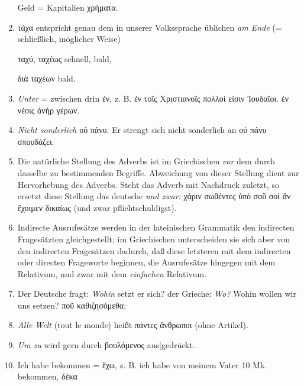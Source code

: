 \begin{enumerate}[leftmargin=0pt,rightmargin=0pt,listparindent =1cm,labelindent=1cm,labelsep=1ex,labelwidth={*},itemindent={*},align=left]
\begin{continuousitemline}Geld = Kapitalien \textgreek[variant=ancient]{χρήματα.
}\par\end{continuousitemline}

\item \textgreek[variant=ancient]{τάχα} ent\textcompwordmark{}spricht
genau dem in unserer Volks\textcompwordmark{}sprache üblichen \emph{am
Ende} (= schließlich, möglicher Weise)


\textgreek[variant=ancient]{ταχύ, ταχέως} schnell, bald,


\textgreek[variant=ancient]{διὰ ταχέων} bald. 

\item \emph{Unter} = zwischen drin \textgreek[variant=ancient]{ἐν,} z. B.
\textgreek[variant=ancient]{ἐν τοῖς Χριστιανοῖς πολλοί εἰσιν Ἰουδαῖοι.
ἐν νέοις ἀνὴρ γέρων.}
\item \emph{Nicht sonderlich} \textgreek[variant=ancient]{οὐ πάνυ.} Er strengt
sich nicht sonderlich an \textgreek[variant=ancient]{οὐ πάνυ σπουδάζει.}
\item Die natürliche Stellung des Adverbs ist im Griechischen \emph{vor}
dem durch dasselbe zu bestimmenden Begriffe. Abweichung von dieser
Stellung dient zur Hervorhebung des Adverbs. Steht das Adverb mit
Nachdruck zuletzt, so ersetzt diese Stellung das deutsche \emph{und
zwar:} \textgreek[variant=ancient]{χάριν σωθέντες ὑπὸ σοῦ σοὶ ἂν ἔχοιμεν
δικαίως} (und zwar pflichtschuldigst). 
\item Indirecte Ausrufesätze werden in der lateinischen Grammatik den indirecten
Fragesätzten gleichgestellt; im Griechischen unterscheiden sie sich
aber von den indirecten Fragesätzen dadurch, daß diese letzteren mit
dem indirecten oder directen Frageworte beginnen, die Ausrufesätze
hingegen mit dem Relativum, und zwar mit dem \emph{einfachen} Relativum.
\item Der Deutsche fragt: \emph{Wohin} setzt er sich? der Grieche: \emph{Wo?}
Wohin wollen wir uns setzen? \textgreek[variant=ancient]{ποῦ καθιζησόμεθα;}
\item \emph{Alle Welt} \textfrench{(tout le monde)} heißt \textgreek[variant=ancient]{πάντες
ἄνθρωποι} (ohne Artikel).
\item \emph{Um zu} wird gern durch \textgreek[variant=ancient]{βουλόμενος}
aus|gedrückt.
\item Ich habe bekommen = \textgreek[variant=ancient]{ἔχω,} z. B. ich habe
von meinem Vater 10 Mk. bekommen, \textgreek[variant=ancient]{δέκα
}
\end{enumerate}
